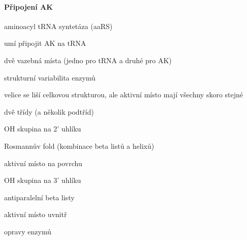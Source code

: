 \documentclass[DIV=8]{scrreprt}
\begin{document}
\paragraph{Připojení AK}
\begin{myItemize}[nosep]
    \item aminoacyl tRNA syntetáza (aaRS)
\begin{myItemize}[nosep]
    \item umí připojit AK na tRNA
    \item dvě vazebná místa (jedno pro tRNA a druhé pro AK)
\end{myItemize}

    \item strukturní variabilita enzymů
\begin{myItemize}[nosep]
    \item velice se liší celkovou strukturou, ale aktivní místo mají všechny skoro stejné
    \item dvě třídy (a několik podtříd)
\begin{myEnumerate}[nosep]
    \item OH skupina na 2' uhlíku
\begin{myItemize}[nosep]
    \item Rosmannův fold (kombinace beta listů a helixů)
    \item aktivní místo na povrchu
\end{myItemize}

    \item OH skupina na 3' uhlíku
\begin{myItemize}[nosep]
    \item antiparalelní beta listy
    \item aktivní místo uvnitř
\end{myItemize}

\end{myEnumerate}

\end{myItemize}

    \item opravy enzymů
\end{myItemize}
\end{document}

